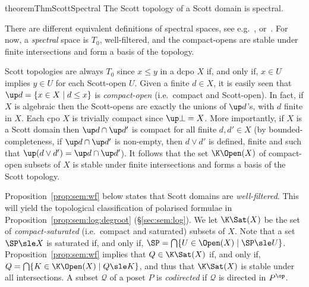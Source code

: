 \begin{restatable}{theorem}{ThmScottSpectral}
\label{thm:spectral}
The Scott topology of a Scott domain is spectral.
\end{restatable}

There are different equivalent definitions of spectral spaces,
see e.g.~\cite[1.1.5]{dst19book},
\cite[\S 6.1]{gg24book} or~\cite[9.5.1]{goubault13book}.
For now, a \emph{spectral} space is $T_0$, well-filtered,
and
the compact-opens are stable under finite intersections and form a basis
of the topology.%
%
%

Scott topologies are always $T_0$ since $x \leq y$ in a dcpo $X$
if, and only if, $x \in U$ implies $y \in U$ for each Scott-open $U$.
%
Given a finite $d \in X$, it is easily seen that 
$\up d = \{ x \in X \mid d \leq x\}$ is
\emph{compact-open} (i.e.\ compact and Scott-open).
%
In fact,
if $X$ is algebraic then the Scott-opens are exactly the unions of $\up d$'s,
with $d$ finite in $X$.
%
Each cpo $X$ is trivially compact since $\up \bot = X$.
More importantly,
if $X$ is a Scott domain then $\up d \cap \up d'$
is compact for all finite $d,d' \in X$
(by bounded-completeness,
if $\up d \cap \up d'$ is non-empty, then $d \vee d'$
is defined, finite and such that $\up (d \vee d') = \up d \cap \up d'$).
%
It follows that the set $\K\Open(X)$ of compact-open subsets of $X$
is stable under finite intersections and forms
a basis of the Scott topology.

Proposition~\ref{prop:sem:wf} below states that Scott domains are \emph{well-filtered}.
This will yield the topological classification of 
polarised formulae in Proposition~\ref{prop:sem:log:degroot} (\S\ref{sec:sem:log}).
%
We let $\K\Sat(X)$ be the set of \emph{compact-saturated}
(i.e.\ compact and saturated) subsets of $X$.
Note that a set $\SP \sle X$ is saturated if, and only if,
$\SP = \bigcap \{U \in \Open(X) \mid \SP \sle U \}$.
%
Proposition~\ref{prop:sem:wf}
implies that $Q \in \K\Sat(X)$ if, and only if,
$Q = \bigcap\{K \in \K\Open(X) \mid Q \sle K \}$,
and thus that $\K\Sat(X)$ is stable under all intersections.
%
A subset $\mathcal{Q}$ of a poset $P$ is \emph{codirected}
if $\mathcal{Q}$ is directed in $P^\op$.


